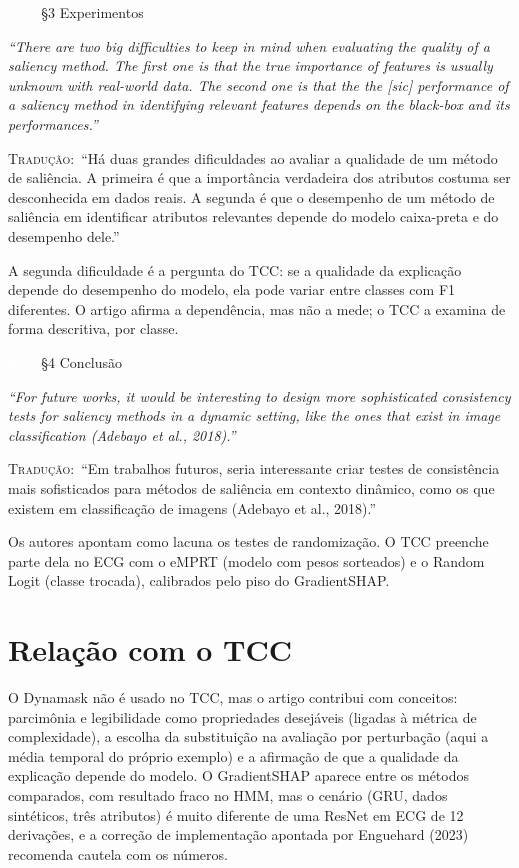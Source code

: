 \documentclass[11pt,a4paper]{article}
\newcommand{\pagechip}[1]{{\setlength{\fboxsep}{1.5pt}\colorbox{cAcc}{\textcolor{white}{\scriptsize\texttt{#1}}}}}
\newenvironment{origquote}{\par\itshape\small}{\par}
\newenvironment{tradquote}{\par\small\textsc{Tradução:}\ }{\par}
\newcommand{\explab}[1]{\par\smallskip{\small\color{cAcc}\textbf{\MakeUppercase{#1}}}\par}
\begin{document}
\begin{citacard}{\pagechip{p. 7} §3 Experimentos}
\begin{origquote}“There are two big difficulties to keep in mind when evaluating the quality of a saliency method. The first one is that the true importance of features is usually unknown with real-world data. The second one is that the the [\textit{sic}] performance of a saliency method in identifying relevant features depends on the black-box and its performances.”\end{origquote}
\begin{tradquote}“Há duas grandes dificuldades ao avaliar a qualidade de um método de saliência. A primeira é que a importância verdadeira dos atributos costuma ser desconhecida em dados reais. A segunda é que o desempenho de um método de saliência em identificar atributos relevantes depende do modelo caixa-preta e do desempenho dele.”\end{tradquote}
\explab{Explicação}
A segunda dificuldade é a pergunta do TCC: se a qualidade da explicação depende do desempenho do modelo, ela pode variar entre classes com F1 diferentes. O artigo afirma a dependência, mas não a mede; o TCC a examina de forma descritiva, por classe.
\end{citacard}

\begin{citacard}{\pagechip{p. 9} §4 Conclusão}
\begin{origquote}“For future works, it would be interesting to design more sophisticated consistency tests for saliency methods in a dynamic setting, like the ones that exist in image classification (Adebayo et al., 2018).”\end{origquote}
\begin{tradquote}“Em trabalhos futuros, seria interessante criar testes de consistência mais sofisticados para métodos de saliência em contexto dinâmico, como os que existem em classificação de imagens (Adebayo et al., 2018).”\end{tradquote}
\explab{Explicação}
Os autores apontam como lacuna os testes de randomização. O TCC preenche parte dela no ECG com o eMPRT (modelo com pesos sorteados) e o Random Logit (classe trocada), calibrados pelo piso do GradientSHAP.
\end{citacard}

\section{Relação com o TCC}
O Dynamask não é usado no TCC, mas o artigo contribui com conceitos: parcimônia e legibilidade como propriedades desejáveis (ligadas à métrica de complexidade), a escolha da substituição na avaliação por perturbação (aqui a média temporal do próprio exemplo) e a afirmação de que a qualidade da explicação depende do modelo. O GradientSHAP aparece entre os métodos comparados, com resultado fraco no HMM, mas o cenário (GRU, dados sintéticos, três atributos) é muito diferente de uma ResNet em ECG de 12 derivações, e a correção de implementação apontada por Enguehard (2023) recomenda cautela com os números.
\end{document}
